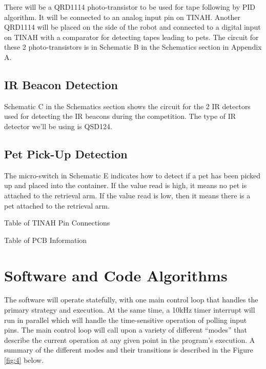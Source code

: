\documentclass[11pt, oneside]{article} %
\begin{document}
	There will be a QRD1114 photo-transistor to be used for tape following by PID algorithm. It will be connected to an analog input pin on TINAH. Another QRD1114 will be placed on the side of the robot and connected to a digital input on TINAH with a comparator for detecting tapes leading to pets. The circuit for these 2 photo-transistors is in Schematic B in the Schematics section in Appendix A. 
	
	\subsection{IR Beacon Detection}
	
	Schematic C in the Schematics section shows the circuit for the 2 IR detectors used for detecting the IR beacons during the competition. The type of IR detector we'll be using is QSD124.
	
	\subsection{Pet Pick-Up Detection}
	
	The micro-switch in Schematic E indicates how to detect if a pet has been picked up and placed into the container. If the value read is high, it means no pet is attached to the retrieval arm. If the value read is low, then it means there is a pet attached to the retrieval arm. 
	
	\begin{table}
		\caption{Table of TINAH Pin Connections}
		\centering
		\label{table:TINAHpins}
	\end{table}
	
	\begin{table}
		\caption{Table of PCB Information}
		\centering
		\label{table:PCBInfo}
	\end{table}
	

\section{Software and Code Algorithms}	
The software will operate statefully, with one main control loop that handles the primary strategy and execution. At the same time, a 10kHz timer interrupt will run in parallel which will handle the time-sensitive operation of polling input pins.
The main control loop will call upon a variety of different “modes” that describe the current operation at any given point in the program's execution. A summary of the different modes and their transitions is described in the Figure \ref{fig:4} below.
\end{document}
